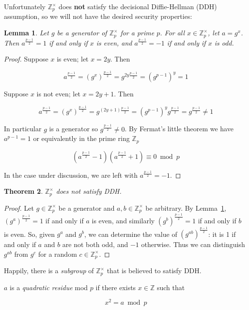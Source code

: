 \documentclass[12pt,a4paper]{article}
\newtheorem{theorem}{Theorem}
\newtheorem{lemma}[theorem]{Lemma}
\theoremstyle{definition}
\begin{document}
Unfortunately $\mathbb{Z}^\times_p$ does \textbf{not} satisfy the decisional Diffie-Hellman (DDH) assumption, so we will not have the desired security properties:
\begin{lemma}\label{lem-parity}
    Let $g$ be a generator of $\mathbb{Z}^\times_p$ for a prime $p$. For all $x\in\mathbb{Z}^\times_p$, let $a=g^x$. Then $a^{\frac{p-1}{2}} = 1$ if and only if $x$ is even, and $a^{\frac{p-1}{2}} = -1$ if and only if $x$ is odd.
\end{lemma}
\begin{proof}
    Suppose $x$ is even; let $x=2y$. Then

    $$a^{\frac{p-1}{2}}=(g^x)^{\frac{p-1}{2}}=g^{2y\frac{p-1}{2}}=(g^{p-1})^y=1$$

    Suppose $x$ is not even; let $x=2y+1$. Then

    $$a^{\frac{p-1}{2}}=(g^x)^{\frac{p-1}{2}}=g^{(2y+1)\frac{p-1}{2}}=(g^{p-1})^yg^{\frac{p-1}{2}}=g^{\frac{p-1}{2}}\neq 1$$

    In particular $g$ is a generator so $g^\frac{p-1}{2}\neq 0$. By Fermat's little theorem we have $a^{p-1}=1$ or equivalently in the prime ring $\mathbb{Z}_p$

    $$\left(a^\frac{p-1}{2}-1\right)\left(a^\frac{p-1}{2}+1\right)\equiv 0\bmod p$$
    
    In the case under discussion, we are left with $a^\frac{p-1}{2}=-1$.
\end{proof}
\begin{theorem}
    $\mathbb{Z}^\times_p$ does not satisfy DDH.
\end{theorem}
\begin{proof}
    Let $g\in\mathbb{Z}^\times_p$ be a generator and $a,b\in\mathbb{Z}^\times_p$ be arbitrary. By Lemma~\ref{lem-parity}, $(g^a)^{\frac{p-1}{2}}=1$ if and only if $a$ is even, and similarly $(g^b)^{\frac{p-1}{2}}=1$ if and only if $b$ is even. So, given $g^a$ and $g^b$, we can determine the value of $\left(g^{ab}\right)^\frac{p-1}{2}$: it is 1 if and only if $a$ and $b$ are not both odd, and $-1$ otherwise. Thus we can distinguish $g^{ab}$ from $g^c$ for a random $c\in\mathbb{Z}^\times_p$.
\end{proof}

Happily, there is a \textit{subgroup} of $\mathbb{Z}^\times_p$ that is believed to satisfy DDH.
\begin{definition}
    $a$ is a \textit{quadratic residue} mod $p$ if there exists $x\in\mathbb{Z}$ such that

    $$x^2=a\bmod p$$

\end{definition}
\end{document}
